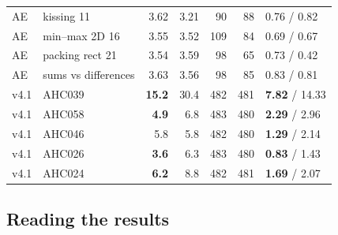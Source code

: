 \begin{table}[H]
\begin{tabular}{@{}llrrrrl@{}}
AE & kissing 11 & 3.62 & 3.21 & 90 & 88 & 0.76 / 0.82 \\
AE & min--max 2D 16 & 3.55 & 3.52 & 109 & 84 & 0.69 / 0.67 \\
AE & packing rect 21 & 3.54 & 3.59 & 98 & 65 & 0.73 / 0.42 \\
AE & sums vs differences & 3.63 & 3.56 & 98 & 85 & 0.83 / 0.81 \\
v4.1 & AHC039 & \textbf{15.2} & 30.4 & 482 & 481 & \textbf{7.82} / 14.33 \\
v4.1 & AHC058 & \textbf{4.9} & 6.8 & 483 & 480 & \textbf{2.29} / 2.96 \\
v4.1 & AHC046 & 5.8 & 5.8 & 482 & 480 & \textbf{1.29} / 2.14 \\
v4.1 & AHC026 & \textbf{3.6} & 6.3 & 483 & 480 & \textbf{0.83} / 1.43 \\
v4.1 & AHC024 & \textbf{6.2} & 8.8 & 482 & 481 & \textbf{1.69} / 2.07 \\
\bottomrule
\end{tabular}
\end{table}

\subsection{Reading the results}

